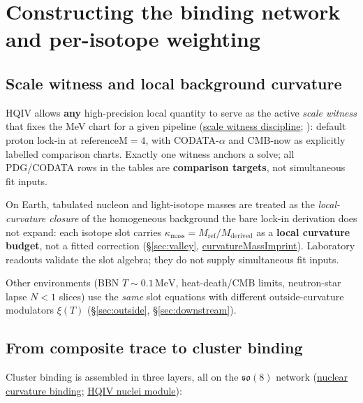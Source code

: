 \documentclass[11pt,notitlepage]{amsart}
\begin{document}
\section{Constructing the binding network and per-isotope weighting}
\label{sec:binding-network}

\subsection{Scale witness and local background curvature}

HQIV allows \textbf{any} high-precision local quantity to serve as the active
\emph{scale witness} that fixes the MeV chart for a given pipeline
(\hyperref[lean:scale-witness]{scale witness discipline};
\cite{hqiv-tuft-sm-lagrangian-paper}): default proton lock-in at
$\mathrm{referenceM}=4$, with CODATA-$\alpha$ and CMB-now as
explicitly labelled comparison charts. Exactly one witness anchors a solve; all
PDG/CODATA rows in the tables are \textbf{comparison targets}, not simultaneous fit
inputs.

On Earth, tabulated nucleon and light-isotope masses are treated as the
\emph{local-curvature closure} of the homogeneous background the bare lock-in
derivation does not expand: each isotope slot carries
$\kappa_{\mathrm{mass}}=M_{\mathrm{ref}}/M_{\mathrm{derived}}$ as a \textbf{local
curvature budget}, not a fitted correction
(\S\ref{sec:valley}, \hyperref[lean:curvature-mass-imprint]{curvatureMassImprint}).
Laboratory readouts validate the slot algebra; they do not supply simultaneous fit
inputs.

Other environments (BBN $T\sim 0.1\,\mathrm{MeV}$, heat-death/CMB limits,
neutron-star lapse $N<1$ slices) use the \emph{same} slot equations with different
outside-curvature modulators $\xi(T)$ (\S\ref{sec:outside}, \S\ref{sec:downstream}).

\subsection{From composite trace to cluster binding}

Cluster binding is assembled in three layers, all on the $\mathfrak{so}(8)$ network
(\hyperref[lean:nuclear-curvature-binding]{nuclear curvature binding};
\hyperref[lean:hqiv-nuclei]{HQIV nuclei module}):
\end{document}
